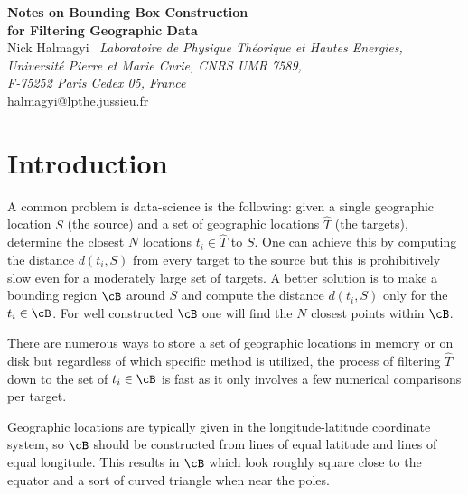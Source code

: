 \documentclass[preprint,12pt]{article}
\begin{document}

\begin{center}
\end{center}

\vspace{0.5cm}
\begin{center}
\baselineskip=13pt {\LARGE \bf{Notes on Bounding Box Construction \\
for Filtering Geographic Data}\\}
 \vskip1.5cm 
Nick Halmagyi\ 
 \vskip0.5cm
\textit{Laboratoire de Physique Th\'eorique et Hautes Energies,\\
Universit\'e Pierre et Marie Curie, CNRS UMR 7589, \\
F-75252 Paris Cedex 05, France}\\
\vskip0.5cm
halmagyi@lpthe.jussieu.fr \\
\end{center}

\section{Introduction}
A common problem is data-science is the following: given a single geographic location $S$ (the  source) and a set of geographic locations $\widehat{T}$ (the targets), determine the closest $N$ locations $t_i \in \widehat{T}$  to $S$. One can achieve this by computing the distance $d(t_i, S)$ from every target to the source but this is prohibitively slow even for a moderately large set of targets. A better solution is to make a bounding region $\cB$ around $S$ and compute the distance  $d(t_i,S)$ only for the $t_i \in \cB$. For well constructed $\cB$ one will find the $N$ closest points within $\cB$. 

There are numerous ways to store a set of geographic locations in memory or on disk but regardless of which specific method is utilized, the process of filtering $\widehat{T}$ down to the set of $t_i\in \cB$ is fast as it only involves a few numerical comparisons per target.


Geographic locations are typically given in the longitude-latitude coordinate system, so $\cB$ should be constructed from lines of equal latitude and lines of equal longitude. This results in $\cB$ which look roughly square close to the equator and a sort of curved triangle when near the poles. 
\end{document}
